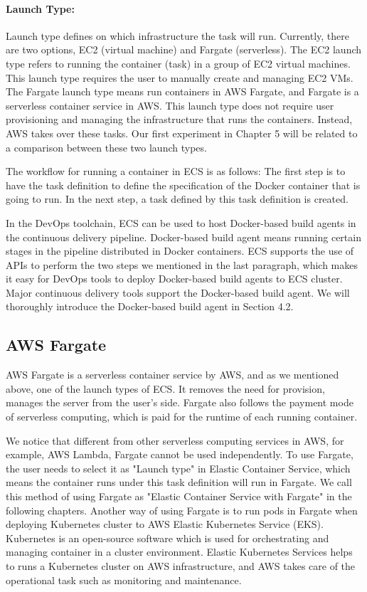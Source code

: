 \paragraph{Launch Type:} Launch type defines on which infrastructure the task will run. Currently, there are two options, EC2 (virtual machine) and Fargate (serverless). The EC2 launch type refers to running the container (task) in a group of EC2 virtual machines. This launch type requires the user to manually create and managing EC2 VMs. The Fargate launch type means run containers in AWS Fargate, and Fargate is a serverless container service in AWS. This launch type does not require user provisioning and managing the infrastructure that runs the containers. Instead, AWS takes over these tasks. Our first experiment in Chapter 5 will be related to a comparison between these two launch types.
\par
The workflow for running a container in ECS is as follows:
The first step is to have the task definition to define the specification of the Docker container that is going to run. In the next step, a task defined by this task definition is created.
\par
In the DevOps toolchain, ECS can be used to host Docker-based build agents in the continuous delivery pipeline. Docker-based build agent means running certain stages in the pipeline distributed in Docker containers. 
ECS supports the use of APIs to perform the two steps we mentioned in the last paragraph, which makes it easy for DevOps tools to deploy Docker-based build agents to ECS cluster.
Major continuous delivery tools support the Docker-based build agent. 
We will thoroughly introduce the Docker-based build agent in Section 4.2.
\subsection{AWS Fargate}
AWS Fargate is a serverless container service by AWS, and as we mentioned above, one of the launch types of ECS. It removes the need for provision, manages the server from the user's side. Fargate also follows the payment mode of serverless computing, which is paid for the runtime of each running container. 
\par
We notice that different from other serverless computing services in AWS, for example, AWS Lambda, Fargate cannot be used independently. To use Fargate, the user needs to select it as "Launch type" in Elastic Container Service, which means the container runs under this task definition will run in Fargate. We call this method of using Fargate as "Elastic Container Service with Fargate" in the following chapters. Another way of using Fargate is to run pods in Fargate when deploying Kubernetes cluster to AWS Elastic Kubernetes Service (EKS). Kubernetes is an open-source software which is used for orchestrating and managing container in a cluster environment. Elastic Kubernetes Services helps to runs a Kubernetes cluster on AWS infrastructure, and AWS takes care of the operational task such as monitoring and maintenance. 
